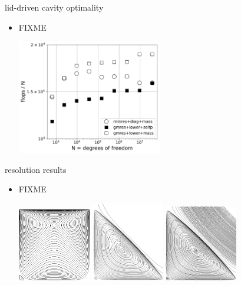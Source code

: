 \documentclass[10pt,hyperref,dvipsnames]{beamer}
\begin{document}
\begin{frame}{lid-driven cavity optimality}

\begin{itemize}
\item FIXME
\begin{center}
\includegraphics[width=0.5\textwidth]{figs/stokesopt-work.pdf}
\end{center}
\end{itemize}
\end{frame}


\begin{frame}{resolution results}

\begin{itemize}
\item FIXME
\begin{center}
\includegraphics[width=0.25\textwidth]{figs/eddies1.png} \qquad \includegraphics[width=0.25\textwidth]{figs/eddies2.png} \qquad \includegraphics[width=0.25\textwidth]{figs/eddies3.png}
\end{center}
\end{itemize}
\end{frame}
\end{document}
